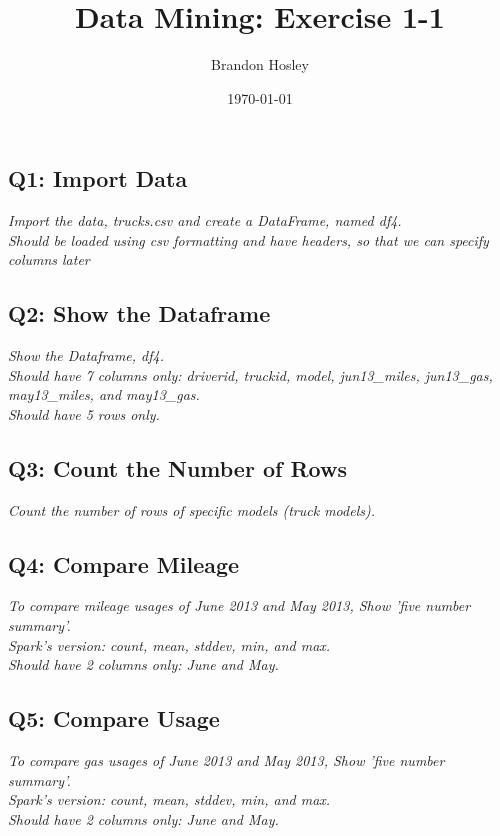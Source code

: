 \documentclass[]{article}
\title{Data Mining: Exercise 1-1}
\author{Brandon Hosley}
\date{\today}
\begin{document}
\maketitle

\subsection*{Q1: Import Data}
\emph{Import the data, trucks.csv and create a DataFrame, named df4. \\
	Should be loaded using csv formatting and have headers, so that we can specify columns later}
	
	
\subsection*{Q2: Show the Dataframe}
\emph{Show the Dataframe, df4. \\
	Should have 7 columns only: driverid, truckid, model, 
	jun13\_miles, jun13\_gas, may13\_miles, and may13\_gas. \\
	Should have 5 rows only.} \\

\subsection*{Q3: Count the Number of Rows}
\emph{Count the number of rows of specific models (truck models).} \\

\subsection*{Q4: Compare Mileage}
\emph{To compare mileage usages of June 2013 and May 2013, 
	Show 'five number summary'. \\
	Spark’s version: count, mean, stddev, min, and max. \\
	Should have 2 columns only: June and May.} \\

\subsection*{Q5: Compare Usage}
\emph{To compare gas usages of June 2013 and May 2013, 
	Show 'five number summary'. \\ Spark’s version: count, mean, stddev, min, and max. \\ Should have 2 columns only: June and May.} \\
\end{document}
